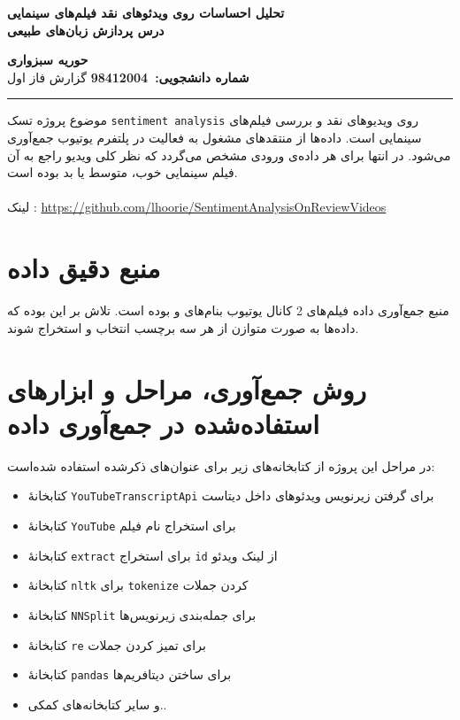 
\def \Subject {تحلیل احساسات روی ویدئوهای نقد فیلم‌‌های سینمایی}
\def \Course {درس پردازش زبان‌های طبیعی}
\def \Author {حوریه سبزواری}
\def \Report {گزارش فاز اول}
\def \StudentNumber {98412004}

\begin{center}
\vspace{.4cm}
{\bf {\huge \Subject}}\\
{\bf \Large \Course}
\vspace{.2cm}
\end{center}
{\bf \Author }  \\
{\bf شماره دانشجویی:\ \StudentNumber}
\hspace{\fill} 
{\Large \Report} \\
\hrule
\vspace{0.8cm}

\clearpage

\par
موضوع پروژه تسک \texttt{sentiment analysis} روی ویدیو‌های نقد و بررسی فیلم‌های سینمایی است. داده‌ها از منتقدهای مشغول به فعالیت در پلتفرم یوتیوب جمع‌آوری می‌شود. در انتها برای هر داده‌ی ورودی مشخص می‌گردد که نظر کلی ویدیو راجع به آن فیلم سینمایی خوب، متوسط یا بد بوده است.\\ \\
لینک : \href{https://github.com/lhoorie/SentimentAnalysisOnReviewVideos}{https://github.com/lhoorie/SentimentAnalysisOnReviewVideos}

\section{منبع دقیق داده}
منبع جمع‌آوری داده فیلم‌های 2 کانال یوتیوب بنام‌های  و  
بوده است. تلاش بر این بوده که داده‌ها به صورت متوازن از هر سه برچسب انتخاب و استخراج شوند.

\section{روش جمع‌آوری، مراحل و ابزارهای استفاده‌شده در جمع‌آوری داده}
 در مراحل این پروژه از کتابخانه‌های زیر برای عنوان‌های ذکرشده استفاده شده‌است:
\begin{itemize}
\item
 کتابخانۀ 
\texttt{YouTubeTranscriptApi} برای گرفتن زیرنویس ویدئوهای داخل دیتاست
\item
  کتابخانۀ 
 \texttt{YouTube} برای استخراج نام فیلم 
 \item
  کتابخانۀ 
 \texttt{extract} برای استخراج \texttt{id} از لینک ویدئو 
 \item
  کتابخانۀ \texttt{nltk} برای \texttt{tokenize} کردن جملات
 \item
  کتابخانۀ \texttt{NNSplit} برای جمله‌بندی زیرنویس‌ها
  \item
  کتابخانۀ \texttt{re} برای تمیز کردن جملات
  \item 
  کتابخانۀ \texttt{pandas} برای ساختن دیتافریم‌ها
  \item و سایر کتابخانه‌های کمکی..
 \end{itemize}

